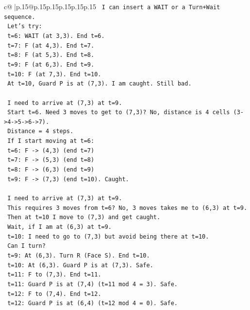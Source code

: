 \documentclass{article}
\begin{document}
{\begin{supertabular}{c@{$\;$}|p{.15\linewidth}@{}p{.15\linewidth}p{.15\linewidth}p{.15\linewidth}p{.15\linewidth}p{.15\linewidth}}
{{{\texttt{   I can insert a WAIT or a Turn+Wait sequence.} \\
\texttt{   Let's try:} \\
\texttt{   t=6: WAIT (at 3,3). End t=6.} \\
\texttt{   t=7: F (at 4,3). End t=7.} \\
\texttt{   t=8: F (at 5,3). End t=8.} \\
\texttt{   t=9: F (at 6,3). End t=9.} \\
\texttt{   t=10: F (at 7,3). End t=10.} \\
\texttt{   At t=10, Guard P is at (7,3). I am caught. Still bad.} \\
\\ 
\texttt{   I need to arrive at (7,3) at t=9.} \\
\texttt{   Start t=6. Need 3 moves to get to (7,3)? No, distance is 4 cells (3{-}>4{-}>5{-}>6{-}>7).} \\
\texttt{   Distance = 4 steps.} \\
\texttt{   If I start moving at t=6:} \\
\texttt{   t=6: F {-}> (4,3) (end t=7)} \\
\texttt{   t=7: F {-}> (5,3) (end t=8)} \\
\texttt{   t=8: F {-}> (6,3) (end t=9)} \\
\texttt{   t=9: F {-}> (7,3) (end t=10). Caught.} \\
\\ 
\texttt{   I need to arrive at (7,3) at t=9.} \\
\texttt{   This requires 3 moves from t=6? No, 3 moves takes me to (6,3) at t=9.} \\
\texttt{   Then at t=10 I move to (7,3) and get caught.} \\
\texttt{   Wait, if I am at (6,3) at t=9.} \\
\texttt{   t=10: I need to go to (7,3) but avoid being there at t=10.} \\
\texttt{   Can I turn?} \\
\texttt{   t=9: At (6,3). Turn R (Face S). End t=10.} \\
\texttt{   t=10: At (6,3). Guard P is at (7,3). Safe.} \\
\texttt{   t=11: F to (7,3). End t=11.} \\
\texttt{   t=11: Guard P is at (7,4) (t=11 mod 4 = 3). Safe.} \\
\texttt{   t=12: F to (7,4). End t=12.} \\
\texttt{   t=12: Guard P is at (6,4) (t=12 mod 4 = 0). Safe.} \\
}}}
\end{supertabular}}
\end{document}

